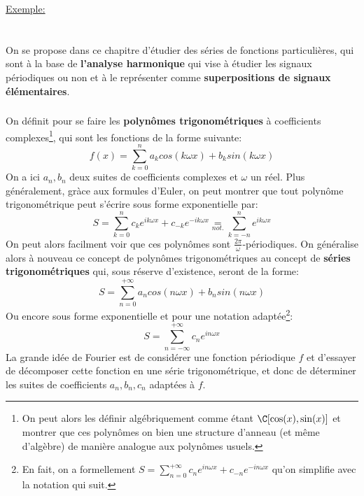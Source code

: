\uline{Exemple:}

\chapter*{}
On se propose dans ce chapitre d'étudier des séries de fonctions particulières, qui sont à la base de \textbf{l'analyse harmonique} qui vise à étudier les signaux périodiques ou non et à le représenter comme \textbf{superpositions de signaux élémentaires}.

\subsection*{}
On définit pour se faire les \textbf{polynômes trigonométriques} à coefficients complexes\footnote[1]{On peut alors les définir algébriquement comme étant \(\C[\cos(x), \sin(x)]\) et montrer que ces polynômes on bien une structure d'anneau (et même d'algèbre) de manière analogue aux polynômes usuels.}, qui sont les fonctions de la forme suivante:
\[
   f(x) = \sum_{k=0}^{n} a_kcos(k\omega x) + b_ksin(k\omega x)    
\]
On a ici \(a_n, b_n\) deux suites de coefficients complexes et \(\omega\) un réel. Plus généralement, gràce aux formules d'Euler, on peut montrer que tout polynôme trigonométrique peut s'écrire sous forme exponentielle par:
\[
   S = \sum_{k = 0}^{n} c_k e^{ik\omega x} + c_{-k}e^{-ik\omega x} \underset{not.}{=} \sum_{k=-n}^{n} e^{ik\omega x}   
\]
On peut alors facilment voir que ces polynômes sont \(\frac{2\pi}{\omega}\)-périodiques. On généralise alors à nouveau ce concept de polynômes trigonométriques au concept de \textbf{séries trigonométriques} qui, sous réserve d'existence, seront de la forme:
\[
   S = \sum_{n=0}^{+\infty} a_ncos(n\omega x) + b_nsin(n\omega x)    
\]
Ou encore sous forme exponentielle et pour une notation adaptée\footnote[2]{En fait, on a formellement \(S = \sum_{n = 0}^{+\infty} c_n e^{in\omega x} + c_{-n}e^{-in\omega x}\) qu'on simplifie avec la notation qui suit.}:
\[
   S = \sum_{n = -\infty}^{+\infty} c_n e^{in\omega x}     
\]
La grande idée de Fourier est de considérer une fonction périodique \(f\) et d'essayer de décomposer cette fonction en une série trigonométrique, et donc de déterminer les suites de coefficients \(a_n, b_n, c_n\) adaptées à \(f\).

